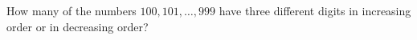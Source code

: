 How many of the numbers $100,101,\ldots,999$ have three different digits in increasing order or in decreasing order?

